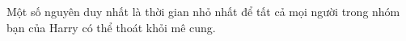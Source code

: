 Một số nguyên duy nhất là thời gian nhỏ nhất để tất cả mọi người trong nhóm bạn của Harry có thể thoát khỏi mê cung.